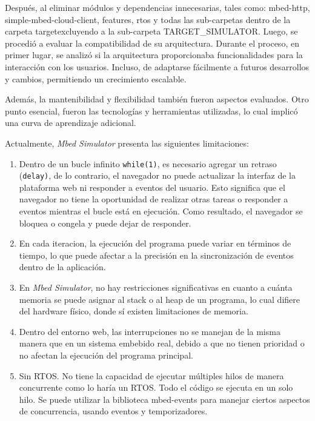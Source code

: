 Después, al eliminar módulos y dependencias innecesarias, tales como: mbed-http, simple-mbed-cloud-client, features, rtos y todas las sub-carpetas dentro de la carpeta \textquotedbl target\textquotedbl excluyendo a la sub-carpeta TARGET\_SIMULATOR.
Luego, se procedió a evaluar la compatibilidad de su arquitectura. Durante el proceso, en primer lugar, se analizó si la arquitectura proporcionaba funcionalidades para la interacción con los usuarios. Incluso, de adaptarse fácilmente a futuros desarrollos y cambios, permitiendo un crecimiento escalable.

Además, la mantenibilidad y flexibilidad también fueron aspectos evaluados. Otro punto esencial, fueron las tecnologías y herramientas utilizadas, lo cual implicó una curva de aprendizaje adicional. 

Actualmente, \textit{Mbed Simulator} presenta las siguientes limitaciones:

\begin{enumerate}
	\item Dentro de un bucle infinito \texttt{while(1)}, es necesario agregar un retraso \newline(\texttt{delay)}, de lo contrario, el navegador no puede actualizar la interfaz de la plataforma web ni responder a eventos del usuario. Esto significa que el navegador no tiene la oportunidad de realizar otras tareas o responder a eventos mientras el bucle está en ejecución. Como resultado, el navegador se bloquea o congela y puede dejar de responder.
	
	\item En cada iteracion, la ejecución del programa puede variar en términos de tiempo, lo que puede afectar a la precisión en la sincronización de eventos dentro de la aplicación.

	\item En \textit{Mbed Simulator}, no hay restricciones significativas en cuanto a cuánta memoria se puede asignar al stack o al heap  de un programa, lo cual difiere del hardware físico, donde sí existen limitaciones de memoria.
	
	\item Dentro del entorno web, las interrupciones no se manejan de la misma manera que en un sistema embebido real, debido a que no tienen prioridad o no afectan la ejecución del programa principal.
	
	\item Sin RTOS. No tiene la capacidad de ejecutar múltiples hilos de manera concurrente como lo haría un RTOS. Todo el código se ejecuta en un solo hilo. Se puede utilizar la biblioteca mbed-events para manejar ciertos aspectos de concurrencia, usando eventos y temporizadores.

\end{enumerate}


